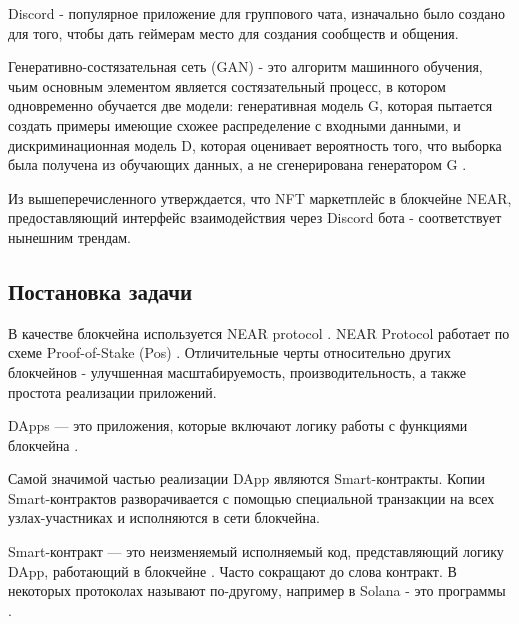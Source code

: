\begin{definition}
    Discord - популярное приложение для группового чата, изначально было создано для того, чтобы дать геймерам место для создания сообществ и общения.
\end{definition}

\begin{definition}
    Генеративно-состязательная сеть (GAN) - это алгоритм машинного обучения, чьим основным элементом является состязательный процесс, в котором одновременно обучается две модели: генеративная модель G, которая пытается создать примеры имеющие схожее распределение с входными данными, и дискриминационная модель D, которая оценивает вероятность того, что выборка была получена из обучающих данных, а не сгенерирована генератором G \cite{generative_adversial_network}.
\end{definition}

Из вышеперечисленного утверждается, что NFT маркетплейс в блокчейне NEAR, предоставляющий интерфейс взаимодействия через Discord бота - соответствует нынешним трендам.


\subsection{Постановка задачи}
В качестве блокчейна используется NEAR protocol \cite{nearprotocol_2022}. NEAR Protocol работает по схеме Proof-of-Stake (Pos) \cite{nearprotocolpos}. Отличительные черты относительно других блокчейнов - улучшенная масштабируемость, производительность, а также простота реализации приложений.

\begin{definition}
    DApps --- это приложения, которые включают логику работы с функциями блокчейна \cite{ramamurthy2020blockchain}.
\end{definition}

Самой значимой частью реализации DApp являются Smart-контракты. Копии Smart-контрактов разворачивается с помощью специальной транзакции на всех узлах-участниках и исполняются в сети блокчейна.

\begin{definition}
    Smart-контракт --- это неизменяемый исполняемый код, представляющий логику DApp, работающий в блокчейне \cite{ramamurthy2020blockchain}. Часто сокращают до слова контракт. В некоторых протоколах называют по-другому, например в Solana - это программы \cite{solanaprogramlibrarydocs}.
\end{definition}

